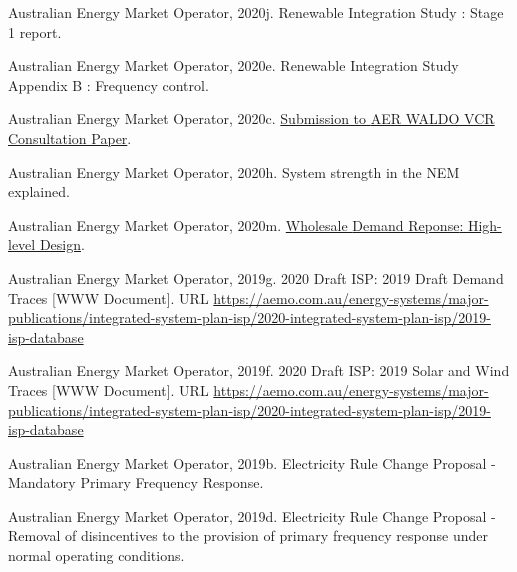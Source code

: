 \documentclass[12pt,a4paper,]{report}
\newlength{\cslhangindent}
\newenvironment{CSLReferences}[2] %
 {%
  \setlength{\parindent}{0pt}
  \ifodd #1 \everypar{\setlength{\hangindent}{\cslhangindent}}\ignorespaces\fi
  \ifnum #2 > 0
  \setlength{\parskip}{#2\baselineskip}
  \fi
 }%
 {}
\begin{document}
\begin{CSLReferences}{1}{0}
\leavevmode{}%
Australian Energy Market Operator, 2020j. Renewable {Integration Study}
: {Stage} 1 report.

\leavevmode{}%
Australian Energy Market Operator, 2020e. Renewable {Integration Study
Appendix B} : {Frequency} control.

\leavevmode{}%
Australian Energy Market Operator, 2020c.
\href{https://www.aer.gov.au/system/files/AEMO\%20-\%20Submission\%20to\%20AER\%20WALDO\%20VCR\%20Consultation\%20Paper\%20-\%20March\%202020.pdf}{Submission
to {AER WALDO VCR Consultation Paper}}.

\leavevmode{}%
Australian Energy Market Operator, 2020h. System strength in the {NEM}
explained.

\leavevmode{}%
Australian Energy Market Operator, 2020m.
\href{https://www.aemo.com.au/-/media/files/initiatives/submissions/2020/wdrm/wdrm-high-level-design-june-2020.pdf}{Wholesale
{Demand Reponse}: {High-level Design}}.

\leavevmode{}%
Australian Energy Market Operator, 2019g. 2020 {Draft ISP}: 2019 {Draft
Demand Traces} {[}WWW Document{]}. URL
\url{https://aemo.com.au/energy-systems/major-publications/integrated-system-plan-isp/2020-integrated-system-plan-isp/2019-isp-database}

\leavevmode{}%
Australian Energy Market Operator, 2019f. 2020 {Draft ISP}: 2019 {Solar}
and {Wind Traces} {[}WWW Document{]}. URL
\url{https://aemo.com.au/energy-systems/major-publications/integrated-system-plan-isp/2020-integrated-system-plan-isp/2019-isp-database}

\leavevmode{}%
Australian Energy Market Operator, 2019b. Electricity {Rule Change
Proposal} - {Mandatory Primary Frequency Response}.

\leavevmode{}%
Australian Energy Market Operator, 2019d. Electricity {Rule Change
Proposal} - {Removal} of disincentives to the provision of primary
frequency response under normal operating conditions.


\end{CSLReferences}
\end{document}
